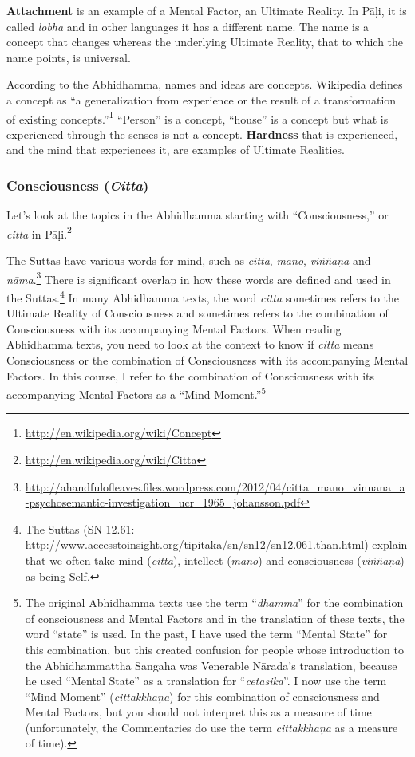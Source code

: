 \textbf{Attachment} is an example of a Mental Factor, an Ultimate Reality. In Pāḷi, it is called \textit{lobha} and in other languages it has a different name. The name is a concept that changes whereas the underlying Ultimate Reality, that to which the name points, is universal.

\pagebreak

According to the Abhidhamma, names and ideas are concepts. Wikipedia defines a concept as “a generalization from experience or the result of a transformation of existing concepts.”\footnote{\url{http://en.wikipedia.org/wiki/Concept}} “Person” is a concept, “house” is a concept but what is experienced through the senses is not a concept. \textbf{Hardness} that is experienced, and the mind that experiences it, are examples of Ultimate Realities.

\subsubsection*{Consciousness (\textit{Citta})}

Let’s look at the topics in the Abhidhamma starting with “Consciousness,” or \textit{citta} in Pāḷi.\footnote{\url{http://en.wikipedia.org/wiki/Citta}}

The Suttas have various words for mind, such as \textit{citta}, \textit{mano}, \textit{viññāṇa} and \textit{nāma}.\footnote{\url{http://ahandfulofleaves.files.wordpress.com/2012/04/citta_mano_vinnana_a-psychosemantic-investigation_ucr_1965_johansson.pdf}} There is significant overlap in how these words are defined and used in the Suttas.\footnote{The Suttas (SN 12.61: \url{http://www.accesstoinsight.org/tipitaka/sn/sn12/sn12.061.than.html}) explain that we often take mind (\textit{citta}), intellect (\textit{mano}) and consciousness (\textit{viññāṇa}) as being Self.} In many Abhidhamma texts, the word \textit{citta} sometimes refers to the Ultimate Reality of Consciousness and sometimes refers to the combination of Consciousness with its accompanying Mental Factors. When reading Abhidhamma texts, you need to look at the context to know if \textit{citta} means Consciousness or the combination of Consciousness with its accompanying Mental Factors. In this course, I refer to the combination of Consciousness with its accompanying Mental Factors as a “Mind Moment.”\footnote{The original Abhidhamma texts use the term “\textit{dhamma}” for the combination of consciousness and Mental Factors and in the translation of these texts, the word “state” is used. In the past, I have used the term “Mental State” for this combination, but this created confusion for people whose introduction to the Abhidhammattha Sangaha was Venerable Nārada’s translation, because he used “Mental State” as a translation for “\textit{cetasika}”. I now use the term “Mind Moment” (\textit{cittakkhaṇa}) for this combination of consciousness and Mental Factors, but you should not interpret this as a measure of time (unfortunately, the Commentaries do use the term \textit{cittakkhaṇa} as a measure of time).} 

